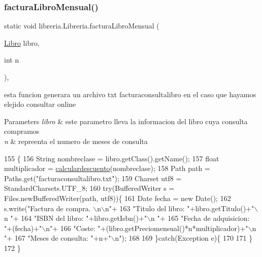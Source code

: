 \subsubsection{\texorpdfstring{factura\+Libro\+Mensual()}{facturaLibroMensual()}}
{\footnotesize\ttfamily static void libreria.\+Libreria.\+factura\+Libro\+Mensual (\begin{DoxyParamCaption}\item[{\mbox{\hyperlink{classlibreria_1_1_libro}{Libro}}}]{libro,  }\item[{int}]{n }\end{DoxyParamCaption})\hspace{0.3cm}{\ttfamily [inline]}, {\ttfamily [static]}}

esta funcion generara un archivo txt facturaconsultalibro en el caso que hayamos elejido consultar online 
\begin{DoxyParams}{Parameters}
{\em libro} & este parametro lleva la informacion del libro cuya consulta compramos \\
\hline
{\em n} & repreenta el numero de meses de consulta \\
\hline
\end{DoxyParams}

\begin{DoxyCode}
155                                                                 \{
156          String nombreclase = libro.getClass().getName();
157          \textcolor{keywordtype}{float} multiplicador = \mbox{\hyperlink{classlibreria_1_1_libreria_a33f2cc093f3c15f09e146283e0c025d7}{calculardescuento}}(nombreclase);
158          Path path = Paths.get(\textcolor{stringliteral}{"facturaconsultalibro.txt"});
159          Charset utf8 = StandardCharsets.UTF\_8;
160          \textcolor{keywordflow}{try}(BufferedWriter s = Files.newBufferedWriter(path, utf8))\{
161              Date fecha = \textcolor{keyword}{new} Date();
162              s.write(\textcolor{stringliteral}{"Factura de compra.   \(\backslash\)n\(\backslash\)n"}+
163                      \textcolor{stringliteral}{"Titulo del libro:   "}+libro.getTitulo()+\textcolor{stringliteral}{"\(\backslash\)n   "}+
164                      \textcolor{stringliteral}{"ISBN del libro:    "}+libro.getIsbn()+\textcolor{stringliteral}{"\(\backslash\)n   "}+
165                      \textcolor{stringliteral}{"Fecha de adquisicion: "}+(fecha)+\textcolor{stringliteral}{"\(\backslash\)n"}+
166                      \textcolor{stringliteral}{"Coste:    "}+(libro.getPreciomensual()*n*multiplicador)+\textcolor{stringliteral}{"\(\backslash\)n   "}+
167                      \textcolor{stringliteral}{"Meses de consulta:    "}+n+\textcolor{stringliteral}{"\(\backslash\)n"});
168              
169          \}\textcolor{keywordflow}{catch}(Exception e)\{
170              
171          \}
172      \}
\end{DoxyCode}
\mbox{\label{classlibreria_1_1_libreria_abc10249e70e74a9ba55a081bbf23cfcd}} 

